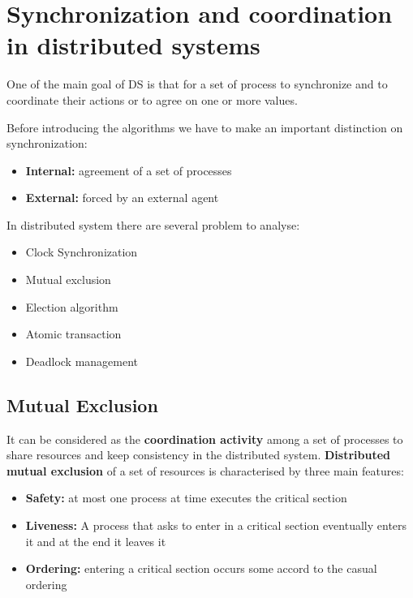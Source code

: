 \chapter{Synchronization and coordination in distributed systems}
One of the main goal of DS is that for a set of process to synchronize and to coordinate their actions or to agree on one or more values.

Before introducing the algorithms we have to make an important distinction on synchronization:
\begin{itemize}
    \item \textbf{Internal:} agreement of a set of processes
    \item \textbf{External:} forced by an external agent
\end{itemize}

In distributed system there are several problem to analyse:
\begin{itemize}
    \item Clock Synchronization
    \item Mutual exclusion
    \item Election algorithm
    \item Atomic transaction
    \item Deadlock management
\end{itemize}

\section{Mutual Exclusion}
It can be considered as the \textbf{coordination activity} among a set of processes to share resources and keep consistency in the distributed system. \textbf{Distributed mutual exclusion} of a set of resources is characterised by three main features:
\begin{itemize}
    \item \textbf{Safety:} at most one process at time executes the critical section
    \item \textbf{Liveness:} A process that asks to enter in a critical section eventually enters it and at the end it leaves it
    \item \textbf{Ordering:} entering a critical section occurs some accord to the casual ordering
\end{itemize}

